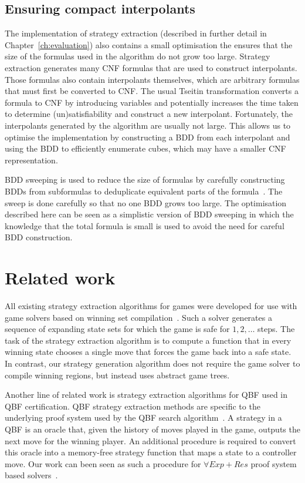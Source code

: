 \subsection{Ensuring compact interpolants}

The implementation of strategy extraction (described in further detail in Chapter~\ref{ch:evaluation}) also contains a small optimisation the ensures that the size of the formulas used in the algorithm do not grow too large. Strategy extraction generates many CNF formulas that are used to construct interpolants. Those formulas also contain interpolants themselves, which are arbitrary formulas that must first be converted to CNF. The usual Tseitin transformation converts a formula to CNF by introducing variables and potentially increases the time taken to determine (un)satisfiability and construct a new interpolant. Fortunately, the interpolants generated by the algorithm are usually not large. This allows us to optimise the implementation by constructing a BDD from each interpolant and using the BDD to efficiently enumerate cubes, which may have a smaller CNF representation. 

BDD sweeping is used to reduce the size of formulas by carefully constructing BDDs from subformulas to deduplicate equivalent parts of the formula~\cite{Kuehlmann97}. The sweep is done carefully so that no one BDD grows too large. The optimisation described here can be seen as a simplistic version of BDD sweeping in which the knowledge that the total formula is small is used to avoid the need for careful BDD construction.

\section{Related work}

All existing strategy extraction algorithms for games were developed for use with game solvers based on winning set compilation~\cite{Bloem14}.  Such a solver generates a sequence of expanding state sets for which the game is safe for $1,2,\ldots$ steps.  The task of the strategy extraction algorithm is to compute a function that in every winning state chooses a single move that forces the game back into a safe state.  In contrast, our strategy generation algorithm does not require the game solver to compile winning regions, but instead uses abstract game trees.

Another line of related work is strategy extraction algorithms for QBF used in QBF certification. QBF strategy extraction methods are specific to the underlying proof system used by the QBF search algorithm~\cite{Lonsing10,Egly13,Goultiaeva11}.  A strategy in a QBF is an oracle that, given the history of moves played in the game, outputs the next move for the winning player.  An additional procedure is required to convert this oracle into a memory-free strategy function that maps a state to a controller move.  Our work can been seen as such a procedure for $\forall Exp+Res$ proof system based solvers~\cite{Janota13}.


